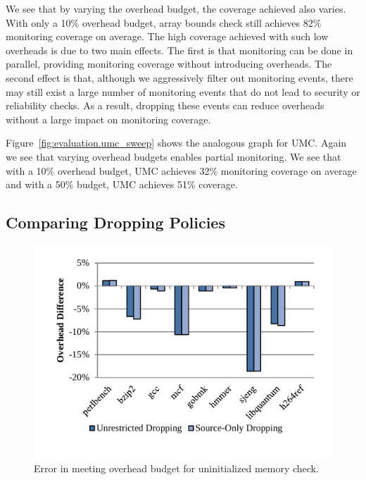 We see that by varying the overhead budget, the coverage achieved also varies.
With only a 10\% overhead budget, array bounds check still
achieves 82\% monitoring coverage on average. The high coverage
achieved with such low overheads is due to two main effects.  The first is that
monitoring can be done in parallel, providing monitoring coverage without
introducing overheads. The second effect is that, although we aggressively
filter out monitoring events, there may still exist a large number of
monitoring events that do not lead to security or reliability checks. As a
result, dropping these events can reduce overheads without a large impact on
monitoring coverage.

Figure~\ref{fig:evaluation.umc_sweep} shows the analogous graph for UMC. Again
we see that varying overhead budgets enables partial monitoring. We see that
with a 10\% overhead budget, UMC achieves 32\% monitoring coverage on average
and with a 50\% budget, UMC achieves 51\% coverage.

\subsection{Comparing Dropping Policies}

\begin{figure}
  \begin{center}
    \includegraphics[width=\columnwidth]{figs/data_umc_exec_time.pdf}
    \vspace{-0.2in}
    \caption{Error in meeting overhead budget for uninitialized memory check.}
    \label{fig:evaluation.umc_exec_time}
    \vspace{-0.2in}
  \end{center}
\end{figure}


